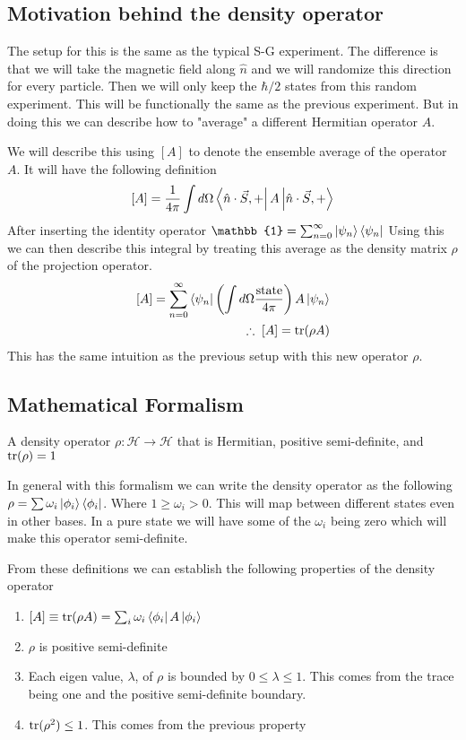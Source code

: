 \subsection{Motivation behind the density operator}
The setup for this is the same as the typical S-G experiment. The difference is that
we will take the magnetic field along $\hat{n}$ and we will randomize this direction
for every particle. Then we will only keep the $\hbar/2$ states from this random experiment.
This will be functionally the same as the previous experiment. But in doing this we can 
describe how to "average" a different Hermitian operator $A$.

We will describe this using $\left[A\right]$ to denote the ensemble average of the
operator $A$. It will have the following definition
$$
    \left[A\right] = \frac{1}{4 \pi} \int d \Omega
       \Bra{\hat{n}\cdot\vec{S}, +} A \Ket{\hat{n}\cdot\vec{S}, +}
$$
After inserting the identity operator 
$\mathbb{1} = \sum_{n=0}^{\infty} \Ket{\psi_n}\Bra{\psi_n}$
Using this we can then describe this integral by treating this 
average as the density matrix $\rho$ of the projection operator.
\begin{align*}
    \left[A\right] = \sum_{n=0}^\infty \Bra{\psi_n}
        \left(\int d \Omega \frac{\text{state}}{4 \pi}\right) A \Ket{\psi_n} \\
    \therefore \; \left[A\right] = \text{tr}(\rho A)
\end{align*}
This has the same intuition as the previous setup with this new operator $\rho$.

\subsection{Mathematical Formalism}
\begin{definition}
\label{denseop}
A density operator $\rho: \mathcal{H} \rightarrow \mathcal{H}$ that is Hermitian,
positive semi-definite, and $\operatorname{tr}(\rho) = 1$
\end{definition}
In general with this formalism we can write the density operator as the following
$\rho = \sum \omega_i \Ket{\phi_i}\Bra{\phi_i}$. 
Where $1 \ge \omega_i > 0$. This will map between
different states even in other bases. In a pure state we will have some of the
$\omega_i$ being zero which will make this operator semi-definite.

From these definitions we can establish the following properties of the
density operator
\begin{enumerate}
    \item $\left[A\right] \equiv \operatorname{tr}(\rho A) = \sum_i \omega_i \Bra{\phi_i} A \Ket{\phi_i}$
    \item $\rho$ is positive semi-definite
    \item Each eigen value, $\lambda$, of $\rho$ is bounded by $0 \le \lambda \le 1$.
        This comes from the trace being one and the positive semi-definite boundary.
    \item $\operatorname{tr}(\rho^2) \le 1$.
        This comes from the previous property
\end{enumerate}

